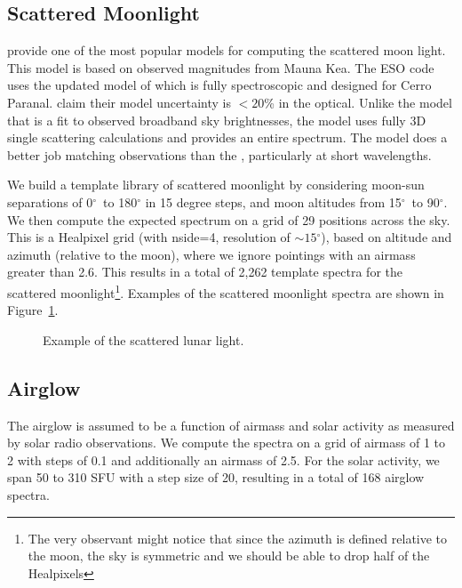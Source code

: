 \documentclass[]{spie}
\newcommand\degree{{^\circ}}
\begin{document}
\subsection{Scattered Moonlight}

\citet{Krisciunas91} provide one of the most popular models for computing the scattered moon light. This model is based on observed magnitudes from Mauna Kea. The ESO code uses the updated model of \citet{Jones13} which is fully spectroscopic and designed for Cerro Paranal. \citet{Jones13} claim their model uncertainty is $<20$\% in the optical.  Unlike the \citet{Krisciunas91} model that is a fit to observed broadband sky brightnesses, the \citet{Jones13} model uses fully 3D single scattering calculations and provides an entire spectrum. The \citet{Jones13} model does a better job matching observations than the \citet{Krisciunas91}, particularly at short wavelengths.

We build a template library of scattered moonlight by considering moon-sun separations of 0$\degree$\ to 180$\degree$ in 15 degree steps, and moon altitudes from 15$\degree$\ to 90$\degree$.  We then compute the expected spectrum on a grid of 29 positions across the sky. This is a Healpixel grid (with nside=4, resolution of $\sim15\degree$), based on altitude and azimuth (relative to the moon), where we ignore pointings with an airmass greater than 2.6. This results in a total of 2,262 template spectra for the scattered moonlight\footnote{The very observant might notice that since the azimuth is defined relative to the moon, the sky is symmetric and we should be able to drop half of the Healpixels}. Examples of the scattered moonlight spectra are shown in Figure~\ref{fig:moon}.

\begin{figure}
  \caption{Example of the scattered lunar light. \label{fig:moon}}
\end{figure}


\subsection{Airglow}

The airglow is assumed to be a function of airmass and solar activity as measured by solar radio observations.  We compute the spectra on a grid of airmass of 1 to 2 with steps of 0.1 and additionally an airmass of 2.5.  For the solar activity, we span 50 to 310 SFU with a step size of 20, resulting in a total of 168 airglow spectra. 
\end{document}
